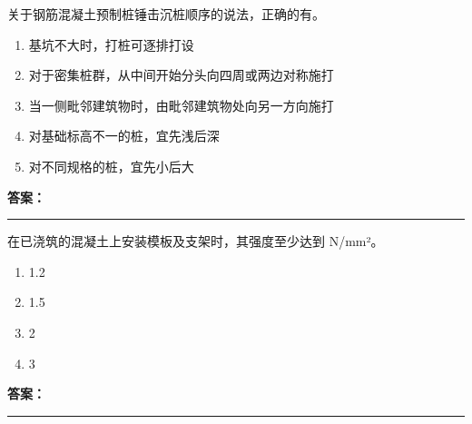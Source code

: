 \documentclass[UTF8,fontset=fandol,11pt]{ctexart}
\newcommand{\answerline}{\textcolor{answerred}{\rule{2.4cm}{0.7pt}}}
\begin{document}
\vspace{0.2em}

\begin{quizbox}[title={乱序第 144 题｜第二章桩基础工程}]

关于钢筋混凝土预制桩锤击沉桩顺序的说法，正确的有。\\

\begin{enumerate}[label=\Alph*.]

\item 基坑不大时，打桩可逐排打设

\item 对于密集桩群，从中间开始分头向四周或两边对称施打

\item 当一侧毗邻建筑物时，由毗邻建筑物处向另一方向施打

\item 对基础标高不一的桩，宜先浅后深

\item 对不同规格的桩，宜先小后大

\end{enumerate}

\textbf{\textcolor{answerred}{答案：}} \answerline

\end{quizbox}

\vspace{0.2em}

\begin{quizbox}[title={乱序第 145 题｜第四章混凝土结构工程}]

在已浇筑的混凝土上安装模板及支架时，其强度至少达到 N/mm²。\\

\begin{enumerate}[label=\Alph*.]

\item 1.2

\item 1.5

\item 2

\item 3

\end{enumerate}

\textbf{\textcolor{answerred}{答案：}} \answerline

\end{quizbox}

\vspace{0.2em}
\end{document}
